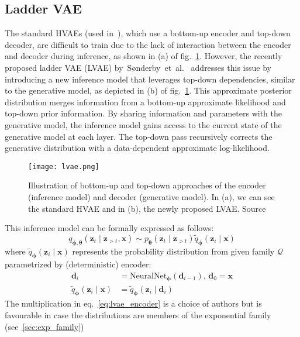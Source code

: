 \subsection{Ladder VAE}
The standard HVAEs (used in~\cite{vae-original-2013,iaf-2016,renedze-backprop-2014}), which use a bottom-up encoder and top-down decoder, are
difficult to train due to the lack of interaction between the encoder and decoder during inference, as shown in (a) of fig.~\ref{fig:lvae}. 
However, the recently proposed ladder VAE (LVAE) by~Sønderby~et~al.~\cite{lvae-2016} addresses this issue by introducing a new inference model
that leverages top-down dependencies, similar to the generative model, as depicted in (b) of fig.~\ref{fig:lvae}. This approximate posterior 
distribution merges information from a bottom-up approximate likelihood and top-down prior information. By sharing information and parameters 
with the generative model, the inference model gains access to the current state of the generative model at each layer. The top-down pass 
recursively corrects the generative distribution with a data-dependent approximate log-likelihood.
\begin{figure}[t]
    \centering
    \texttt{[image: lvae.png]}
    \caption[Ladder VAE]{Illustration of bottom-up and top-down approaches of the encoder (inference model) and decoder (generative model). In (a), we can see the standard HVAE and in (b), the newly proposed LVAE.
    Source~\cite{lvae-2016}}
    \label{fig:lvae}
\end{figure}
This inference model can be formally expressed as follows:
\begin{equation}
q_{\boldsymbol{\phi},\boldsymbol{\theta}}(\boldsymbol{z}_{t}\mid\boldsymbol{z}_{>t}, \boldsymbol{x}) \sim p_{\boldsymbol{\theta}}(\boldsymbol{z}_{t}\mid\boldsymbol{z}_{>t})\tilde{q}_{\boldsymbol{\phi}}(\boldsymbol{z}_i \mid \boldsymbol{x}) \label{eq:lvae_encoder}
\end{equation}
where $\tilde{q}_{\boldsymbol{\phi}}(\boldsymbol{z}_i \mid \boldsymbol{x})$ represents the probability distribution from given family $\mathcal{Q}$ parametrized by (deterministic) encoder:
\begin{align*}
\boldsymbol{d}_i &= \mathrm{NeuralNet}_{\boldsymbol{\phi}} (\boldsymbol{d}_{i-1}) , \, \boldsymbol{d}_0 = \boldsymbol{x} \\
\tilde{q}_{\boldsymbol{\phi}}(\boldsymbol{z}_i \mid \boldsymbol{x}) &= \tilde{q}_{\boldsymbol{\phi}}(\boldsymbol{z}_i \mid \boldsymbol{d}_i )
\end{align*}
The multiplication in eq.~\ref{eq:lvae_encoder} is a choice of authors but is favourable in case the distributions are members of the exponential family (see~\ref{sec:exp_family})
